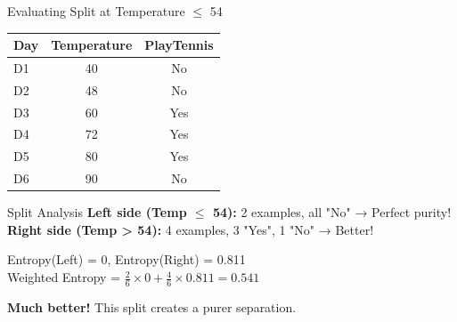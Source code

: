 \documentclass[usenames,dvipsnames]{beamer}
\begin{document}
    \begin{frame}{Evaluating Split at Temperature $\leq$ 54}
        \begin{table}[]
            \begin{tabular}{@{}lcc@{}}
                \toprule
                \textbf{Day} & \textbf{Temperature} & \textbf{PlayTennis} \\ \midrule
                D1           & 40                   & No                  \\
                D2           & 48                   & No                  \\
                \hline
                D3           & 60                   & Yes                 \\
                D4           & 72                   & Yes                 \\
                D5           & 80                   & Yes                 \\
                D6           & 90                   & No                  \\ \bottomrule
            \end{tabular}
        \end{table}

        \begin{examplebox}{Split Analysis}
        \textbf{Left side (Temp $\leq$ 54):} 2 examples, all "No" → Perfect purity! \\
        \textbf{Right side (Temp > 54):} 4 examples, 3 "Yes", 1 "No" → Better!

        Entropy(Left) = 0, Entropy(Right) = 0.811 \\
        Weighted Entropy = $\frac{2}{6} \times 0 + \frac{4}{6} \times 0.811 = 0.541$
        \end{examplebox}

        \textbf{Much better!} This split creates a purer separation.
    \end{frame}
\end{document}
